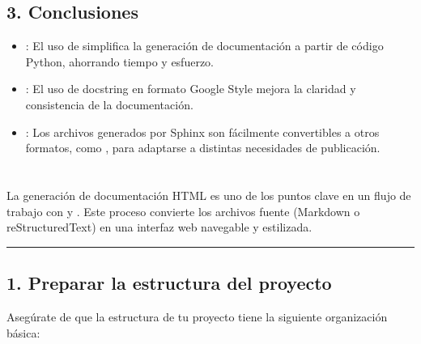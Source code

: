 \documentclass[a4paper,10pt,spanish]{sphinxmanual}
\begin{document}
\subsection{3. Conclusiones}
\label{\detokenize{configuracion_inicial/007.Creacion_de_ficheros_de_codigo_y_generacion_automatica_de_documentacion:conclusiones}}\begin{itemize}
\item {} 
\sphinxAtStartPar
{}: El uso de  simplifica la generación de documentación a partir de código Python, ahorrando tiempo y esfuerzo.

\item {} 
\sphinxAtStartPar
{}: El uso de docstring en formato Google Style mejora la claridad y consistencia de la documentación.

\item {} 
\sphinxAtStartPar
{}: Los archivos  generados por Sphinx son fácilmente convertibles a otros formatos, como , para adaptarse a distintas necesidades de publicación.

\end{itemize}

\sphinxstepscope


\section{}
\label{\detokenize{configuracion_inicial/008.Generar_HTML:generacion-de-html-a-partir-de-la-documentacion}}\label{\detokenize{configuracion_inicial/008.Generar_HTML::doc}}
\sphinxAtStartPar
La generación de documentación HTML es uno de los puntos clave en un flujo de trabajo con  y . Este proceso convierte los archivos fuente (Markdown o reStructuredText) en una interfaz web navegable y estilizada.


\bigskip\hrule\bigskip



\subsection{1. Preparar la estructura del proyecto}
\label{\detokenize{configuracion_inicial/008.Generar_HTML:preparar-la-estructura-del-proyecto}}
\sphinxAtStartPar
Asegúrate de que la estructura de tu proyecto tiene la siguiente organización básica:
\end{document}
